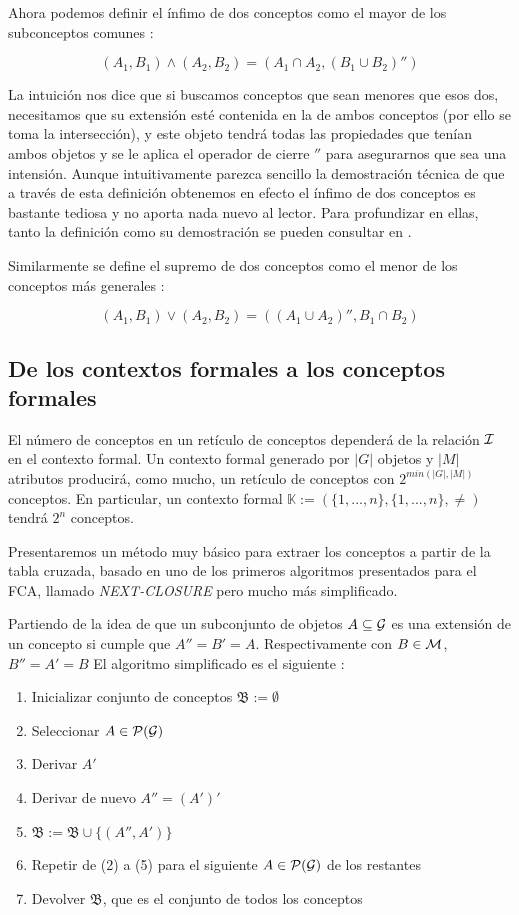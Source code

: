 \documentclass[oneside,openright,titlepage,numbers=noenddot,openany,headinclude,footinclude=true,
cleardoublepage=empty,abstractoff,BCOR=5mm,paper=a4,fontsize=12pt,main=spanish]{scrreprt}
\begin{document}
Ahora podemos definir el ínfimo de dos conceptos como el mayor de los subconceptos comunes \cite{conceptualexploration}:

$$(A_1,B_1) \wedge (A_2,B_2)=(A_1 \cap A_2,(B_1 \cup B_2)'')$$

La intuición nos dice que si buscamos conceptos que sean menores que esos dos, necesitamos que su extensión esté contenida en la de ambos conceptos (por ello se toma la intersección), y este objeto tendrá todas las propiedades que tenían ambos objetos y se le aplica el operador de cierre $''$ para asegurarnos que sea una intensión. Aunque intuitivamente parezca sencillo la demostración técnica de que a través de esta definición obtenemos en efecto el ínfimo de dos conceptos es bastante tediosa y no aporta nada nuevo al lector. Para profundizar en ellas, tanto la definición como su demostración se pueden consultar en \cite{conceptualexploration}.

Similarmente se define el supremo de dos conceptos como el menor de los conceptos más generales \cite{conceptualexploration}:

$$(A_1,B_1) \vee (A_2,B_2)=((A_1 \cup A_2)'',B_1 \cap B_2)$$




\subsection{De los contextos formales a los conceptos formales}

El número de conceptos en un retículo de conceptos dependerá de la relación $\mathcal{I}$ en el contexto formal. Un contexto formal generado por $|G|$ objetos y $|M|$ atributos producirá, como mucho, un retículo de conceptos con $2^{min(|G|,|M|)}$ conceptos. En particular, un contexto formal $\mathbb{K}:= (\{1,...,n\},\{1,...,n\}, \neq)$ tendrá $2^{n}$ conceptos.

Presentaremos un método muy básico para extraer los conceptos a partir de la tabla cruzada, basado en uno de los primeros algoritmos presentados para el FCA, llamado \textit{NEXT-CLOSURE} \cite{Ganter} pero mucho más simplificado.

Partiendo de la idea de que un subconjunto de objetos $A\subseteq \mathcal{G}$ es una extensión de un concepto si cumple que $A''=B'=A$. Respectivamente con $B\in \mathcal{M}$, $B''=A'=B$ El algoritmo simplificado es el siguiente \cite{inforetrieval}:

\begin{enumerate}
    \item Inicializar conjunto de conceptos $\mathfrak{B}:=\emptyset$
    \item Seleccionar $A \in \mathcal{P}(\mathcal{G})$
    \item Derivar $A'$
    \item Derivar de nuevo $A''= (A')'$
    \item $\mathfrak{B}:=\mathfrak{B}\cup \{(A'',A')\}$
    \item Repetir de (2) a (5) para el siguiente $A \in \mathcal{P}(\mathcal{G})$ de los restantes
    \item Devolver $\mathfrak{B}$, que es el conjunto de todos los conceptos
\end{enumerate}
\end{document}
